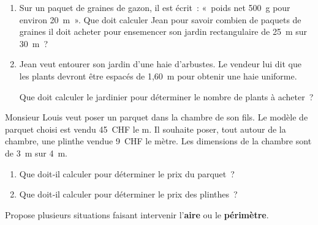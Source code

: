 \begin{activite}

\begin{partie}[Au jardin]
\begin{enumerate}
 \item Sur un paquet de graines de gazon, il est écrit : « poids net 500 g pour environ 20 m ». Que doit calculer Jean pour savoir combien de paquets de graines il doit acheter pour ensemencer son jardin rectangulaire de 25 m sur 30 m ?
 \item Jean veut entourer son jardin d'une haie d'arbustes. Le vendeur lui dit que les plants devront être espacés de 1,60 m pour obtenir une haie uniforme.
 
Que doit calculer le jardinier pour déterminer le nombre de plants à acheter ?
 \end{enumerate}
\end{partie}

\begin{partie}[À la maison]
Monsieur Louis veut poser un parquet dans la chambre de son fils. Le modèle de parquet choisi est vendu 45 CHF le m. Il souhaite poser, tout autour de la chambre, une plinthe vendue 9 CHF le mètre. Les dimensions de la chambre sont de 3 m sur 4 m.
\begin{enumerate}
 \item Que doit‑il calculer pour déterminer le prix du parquet ?
 \item Que doit‑il calculer pour déterminer le prix des plinthes ?
 \end{enumerate}
\end{partie}

\begin{partie}
Propose plusieurs situations faisant intervenir l'\textbf{aire} ou le \textbf{périmètre}.
\end{partie}

\end{activite}


